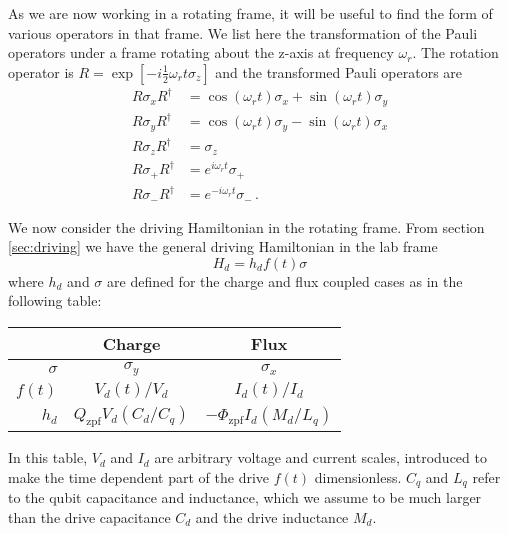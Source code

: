 As we are now working in a rotating frame, it will be useful to find the form of various operators in that frame.
We list here the transformation of the Pauli operators under a frame rotating about the z-axis at frequency $\omega_r$.
The rotation operator is $R=\exp \left[-i \frac{1}{2} \omega_r t \sigma_z \right]$  and the transformed Pauli operators are
\begin{align*}
  R\sigma_xR^{\dagger} & = \cos(\omega_r t)\sigma_x + \sin(\omega_r t) \sigma_y \\
  R\sigma_yR^{\dagger} & = \cos(\omega_r t)\sigma_y - \sin(\omega_r t) \sigma_x \\
  R\sigma_zR^{\dagger} & = \sigma_z \\
  R\sigma_+R^{\dagger} & = e^{i\omega_r t}\sigma_+ \\
  R\sigma_-R^{\dagger} & = e^{-i\omega_r t}\sigma_- \, .
\end{align*}


We now consider the driving Hamiltonian in the rotating frame.
From section \ref{sec:driving} we have the general driving Hamiltonian in the lab frame
\begin{equation}
  H_d = h_d f(t) \sigma
\end{equation}
where $h_d$ and $\sigma$ are defined for the charge and flux coupled cases as in the following table:
\begin{center}
  \begin{tabular}{r|cc}
    \hline
    & \textbf{Charge} & \textbf{Flux} \\
    \hline
    $\sigma$ & $\sigma_y$ & $\sigma_x$ \\
    $f(t)$ & $V_d(t)/V_d$ & $I_d(t) / I_d$ \\
    $h_d$ & $Q_\text{zpf} V_d(C_d/C_q)$ & $-\Phi_\text{zpf} I_d (M_d/L_q)$ \\
    \hline
  \end{tabular}
\end{center}
In this table, $V_d$ and $I_d$ are arbitrary voltage and current scales, introduced to make the time dependent part of the drive $f(t)$ dimensionless.
$C_q$ and $L_q$ refer to the qubit capacitance and inductance, which we assume to be much larger than the drive capacitance $C_d$ and the drive inductance $M_d$.

